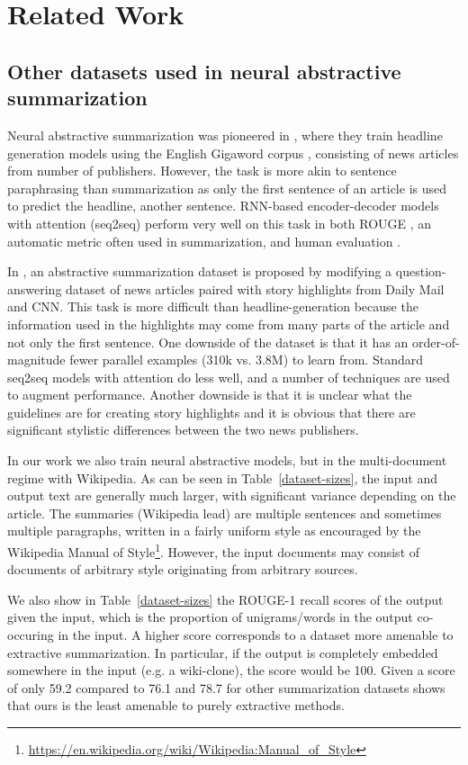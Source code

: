 \section{Related Work}
\label{sec:related}
\subsection{Other datasets used in neural abstractive summarization}
Neural abstractive summarization was pioneered in
\citet{Rush2015}, where they train headline generation models using the
English Gigaword corpus
\citep{graff2003english}, consisting of news articles from number of publishers.
However, the task is more akin to sentence paraphrasing
 than summarization
as only the first sentence of an article is used to predict the headline,
another sentence.
RNN-based encoder-decoder models with attention (seq2seq) perform very well on this task
in both
ROUGE \citep{lin2004rouge}, an automatic metric often used in summarization,
and human evaluation
\citep{chopra2016abstractive}.

In \citet{nallapati2016abstractive}, an abstractive
summarization dataset is
proposed by modifying a question-answering dataset of news articles paired
with story highlights from Daily Mail and CNN. This task is more difficult than
 headline-generation because the information used in the highlights may
 come from many parts of the article and not only the first sentence. One downside
 of the dataset is that it has an order-of-magnitude fewer parallel examples (310k vs. 3.8M) to learn from.
 Standard seq2seq models with attention do less well, and a number
 of techniques are used to augment performance.
 Another downside is that it is unclear what the guidelines are for
 creating story highlights and it is obvious that there are significant
 stylistic differences between the two news publishers.

 In our work we also train neural abstractive models, but
 in the multi-document regime with Wikipedia.
 As can be seen in Table~\ref{dataset-sizes}, the input and output text are
 generally much larger, with significant variance depending on the article.
 The summaries (Wikipedia lead) are multiple sentences and sometimes multiple
 paragraphs, written in a fairly uniform style as encouraged
 by the Wikipedia Manual of Style\footnote{\url{https://en.wikipedia.org/wiki/Wikipedia:Manual_of_Style}}. However, the input documents may consist
 of documents of arbitrary style originating from arbitrary sources.

 We also show in Table~\ref{dataset-sizes} the ROUGE-1 recall scores of the output
 given the input, which is the proportion of unigrams/words
 in the output co-occuring
 in the input. A higher score corresponds to a dataset more amenable to
 extractive summarization. In particular, if the output is completely embedded somewhere
 in the input (e.g. a wiki-clone), the score would be 100. Given a score of only 59.2 compared
 to 76.1 and 78.7 for other summarization datasets shows that ours is the least amenable to purely extractive methods.

